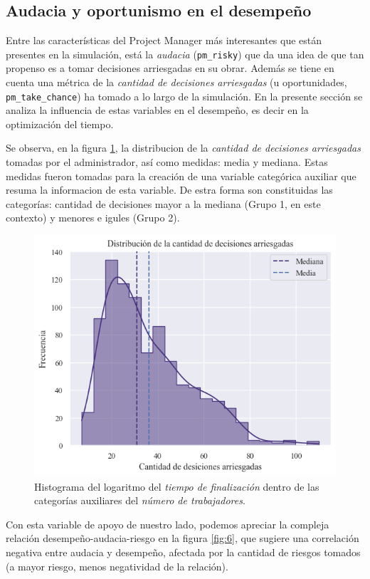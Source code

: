 \documentclass[a4paper, 12pt]{article}
\begin{document}
\subsection{Audacia y oportunismo en el desempeño}
	Entre las características del Project Manager más interesantes que están presentes en la simulación, está la \emph{audacia} (\texttt{pm\_risky}) que da una idea de que tan propenso es a tomar decisiones arriesgadas en su obrar. Además se tiene en cuenta una métrica de la \emph{cantidad de decisiones arriesgadas} (u oportunidades, \texttt{pm\_take\_chance}) ha tomado a lo largo de la simulación. En la presente sección se analiza la influencia de estas variables en el desempeño, es decir en la optimización del tiempo.
	 
	 Se observa, en la figura \ref{fig:5}, la distribucion de la \emph{cantidad de decisiones arriesgadas} tomadas por el administrador, así como medidas: media y mediana. Estas medidas fueron tomadas para la creación de una variable categórica auxiliar que resuma la informacion de esta variable. De estra forma son constituidas las categorías: cantidad de decisiones mayor a la mediana (Grupo 1, en este contexto) y menores e igules (Grupo 2).

	\begin{figure}[htb!]
		\centering
		\includegraphics[height = .50\linewidth, width=.50\linewidth]{assets/take_chance_dist}
		\caption{Histograma del logaritmo del  \emph{tiempo de finalización} dentro de las categorías auxiliares del \emph{número de trabajadores}.}
		\label{fig:5}
	\end{figure}
	
	Con esta variable de apoyo de nuestro lado, podemos apreciar la compleja relación desempeño-audacia-riesgo en la figura \ref{fig:6}, que sugiere una correlación negativa entre audacia y desempeño, afectada por la cantidad de riesgos tomados (a mayor riesgo, menos negatividad de la relación).
	
\end{document}
